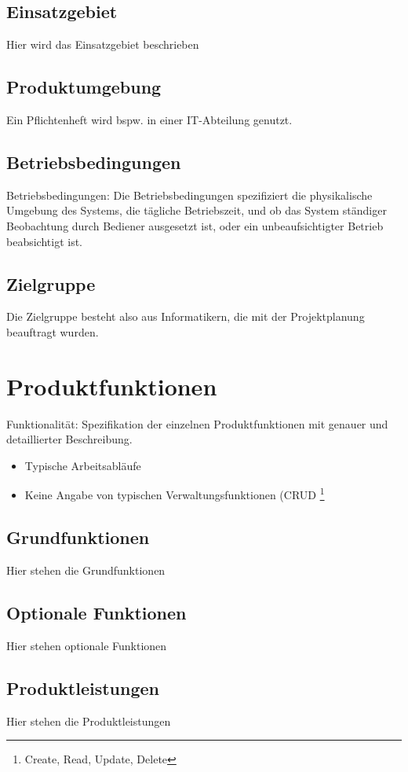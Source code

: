 \documentclass[a4paper]{scrreprt}
\begin{document}
\section{Einsatzgebiet}
Hier wird das Einsatzgebiet beschrieben
 
\section{Produktumgebung}
Ein Pflichtenheft wird bspw. in einer IT-Abteilung genutzt.

\section{Betriebsbedingungen}
Betriebsbedingungen: Die Betriebsbedingungen spezifiziert die physikalische
Umgebung des Systems, die tägliche Betriebszeit, und ob das System ständiger
Beobachtung durch Bediener ausgesetzt ist, oder ein unbeaufsichtigter Betrieb
beabsichtigt ist.
 
 
\section{Zielgruppe}
Die Zielgruppe besteht also aus Informatikern, die mit der Projektplanung
beauftragt wurden.

\chapter{Produktfunktionen}
Funktionalität: Spezifikation der einzelnen Produktfunktionen mit genauer und
detaillierter Beschreibung.

\begin{itemize}
  \item Typische Arbeitsabläufe
  \item Keine Angabe von typischen Verwaltungsfunktionen (CRUD \footnote{Create,
Read, Update, Delete}
\end{itemize}

\section{Grundfunktionen}
Hier stehen die Grundfunktionen

\section{Optionale Funktionen}
Hier stehen optionale Funktionen

\section{Produktleistungen}
Hier stehen die Produktleistungen
\end{document}
